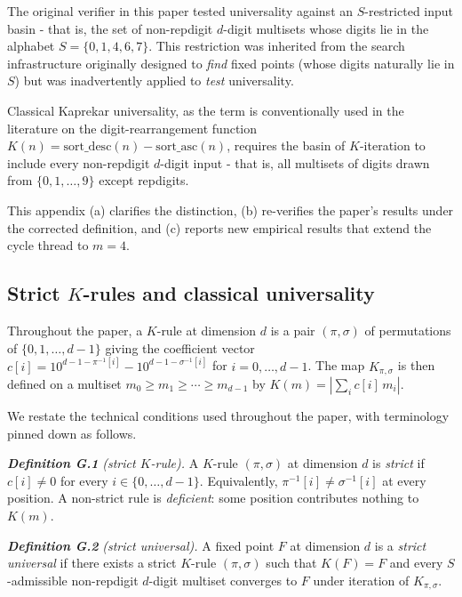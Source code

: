 \documentclass[11pt,letterpaper]{article}
\theoremstyle{paperstyle}
\theoremstyle{paperstyledef}
\theoremstyle{paperstylerem}
\begin{document}
The original verifier in this paper tested universality against an
\(S\)-restricted input basin - that is, the set of non-repdigit
\(d\)-digit multisets whose digits lie in the alphabet
\(S = \{0, 1, 4, 6, 7\}\). This restriction was inherited from the
search infrastructure originally designed to \emph{find} fixed points
(whose digits naturally lie in \(S\)) but was inadvertently applied to
\emph{test} universality.

Classical Kaprekar universality, as the term is conventionally used in
the literature on the digit-rearrangement function
\(K(n) = \mathrm{sort\_desc}(n) - \mathrm{sort\_asc}(n)\), requires the
basin of \(K\)-iteration to include every non-repdigit \(d\)-digit input - that is, all multisets of digits drawn from \(\{0, 1, \ldots, 9\}\)
except repdigits.

This appendix (a) clarifies the distinction, (b) re-verifies the paper's
results under the corrected definition, and (c) reports new empirical
results that extend the cycle thread to \(m = 4\).

\hypertarget{g.2-strict-k-rules-and-classical-universality}{%
\subsection{\texorpdfstring{Strict \(K\)-rules and classical universality}{Strict K-rules and classical universality}}\label{g.2-strict-k-rules-and-classical-universality}}

Throughout the paper, a \(K\)-rule at dimension \(d\) is a pair
\((\pi, \sigma)\) of permutations of \(\{0, 1, \ldots, d-1\}\) giving
the coefficient vector
\(c[i] = 10^{d-1-\pi^{-1}[i]} - 10^{d-1-\sigma^{-1}[i]}\) for
\(i = 0, \ldots, d-1\). The map \(K_{\pi, \sigma}\) is then defined on a
multiset \(m_0 \geq m_1 \geq \cdots \geq m_{d-1}\) by
\(K(m) = \left|\sum_i c[i]\, m_i\right|\).

We restate the technical conditions used throughout the paper, with
terminology pinned down as follows.

\textbf{\emph{Definition G.1}} \emph{(strict \(K\)-rule).} A \(K\)-rule
\((\pi, \sigma)\) at dimension \(d\) is \emph{strict} if \(c[i] \neq 0\)
for every \(i \in \{0, \ldots, d-1\}\). Equivalently,
\(\pi^{-1}[i] \neq \sigma^{-1}[i]\) at every position. A non-strict rule
is \emph{deficient}: some position contributes nothing to \(K(m)\).

\textbf{\emph{Definition G.2}} \emph{(strict universal).} A fixed point
\(F\) at dimension \(d\) is a \emph{strict universal} if there exists a
strict \(K\)-rule \((\pi, \sigma)\) such that \(K(F) = F\) and every
\(S\)-admissible non-repdigit \(d\)-digit multiset converges to \(F\)
under iteration of \(K_{\pi, \sigma}\).
\end{document}
